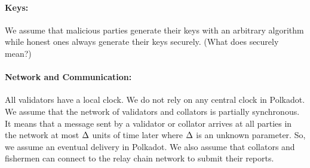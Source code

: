 \paragraph{Keys:} We assume that malicious parties generate their keys with an arbitrary algorithm
while honest ones always generate their keys securely. (What does securely mean?)

\paragraph{Network and Communication:} All validators have a local clock.
We do not rely on any central clock in Polkadot.
We assume that the network of validators and collators is partially synchronous.
It means that a message sent by a validator or collator arrives at all parties in the network
at most $\Delta$ units of time later where $\Delta$ is an unknown parameter. So, we assume an eventual delivery in Polkadot.
We also assume that collators and fishermen can connect to the relay chain network to submit their reports.
